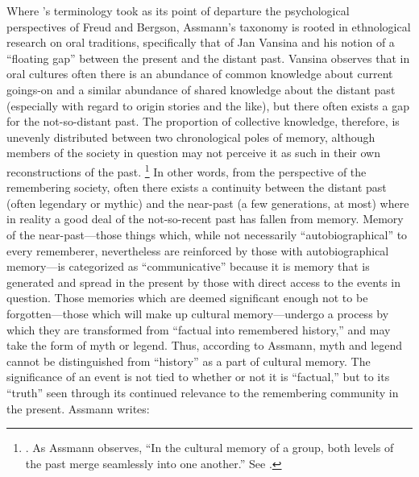 Where \halbwachs's terminology took as its point of departure the psychological perspectives of Freud%
    \autocite{terdiman_radstone-schwarz2011}
and Bergson,%
    \autocite{ansellpearson_radstone-schwarz2011}
Assmann's taxonomy is rooted in ethnological research on oral traditions, specifically that of Jan Vansina and his notion of a ``floating gap'' between the present and the distant past.%
    \autocite{vansina1985}
Vansina observes that in oral cultures often there is an abundance of common knowledge about current goings-on and a similar abundance of shared knowledge about the distant past (especially with regard to origin stories and the like), but there often exists a gap for the not-so-distant past. The proportion of collective knowledge, therefore, is unevenly distributed between two chronological poles of memory, although members of the society in question may not perceive it as such in their own reconstructions of the past.%
    \footnote{%
        \Cite[23--24]{vansina1985}. 
        As Assmann observes, ``In the cultural memory of a group, both levels of the past merge seamlessly into one another.'' See 
        \cite[35]{assmann2011}.}
In other words, from the perspective of the remembering society, often there exists a continuity between the distant past (often legendary or mythic) and the near-past (a few generations, at most) where in reality a good deal of the not-so-recent past has fallen from memory. Memory of the near-past---those things which, while not necessarily ``autobiographical'' to every rememberer, nevertheless are reinforced by those with autobiographical memory---is categorized as ``communicative'' because it is memory that is generated and spread in the present by those with direct access to the events in question. Those memories which are deemed significant enough not to be forgotten---those which will make up cultural memory---undergo a process by which they are transformed from ``factual into remembered history,'' and may take the form of myth or legend.%
    \autocite[37--38]{assmann2011}
Thus, according to Assmann, myth and legend cannot be distinguished from ``history'' as a part of cultural memory. The significance of an event is not tied to whether or not it is ``factual,'' but to its ``truth'' seen through its continued relevance to the remembering community in the present.%
    \autocite[Paul Veyne offers a particularly stimulating discussion of the perception of the past and its relationship to myth. He concludes his book with the insightful quote, ``The theme of this book was very simple. Merely by reading the title, anyone with the slightest historical background would immediately have answered, `but of course they believed in their myths!' We have simply wanted also to make clear that what is true of `them' is also true of ourselves and to bring out the implications of this primary truth.''][128--129]{veyne1988}
Assmann writes:  

